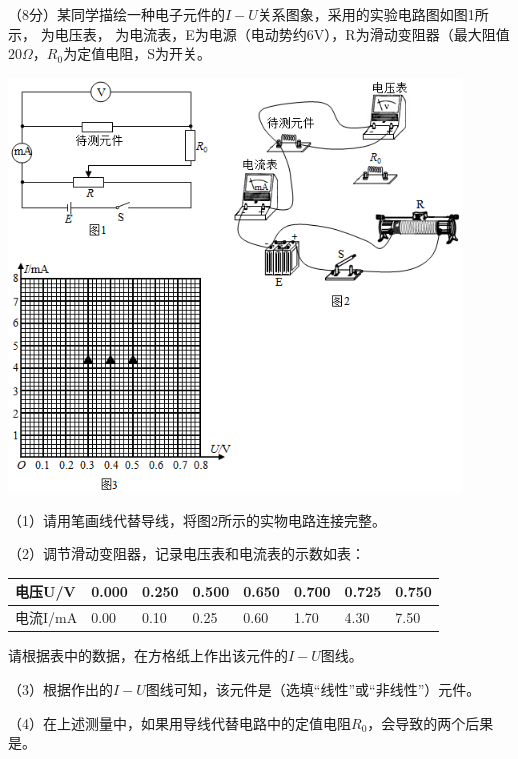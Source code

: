 \question[6] （8分）某同学描绘一种电子元件的$I-U$关系图象，采用的实验电路图如图1所示，  为电压表， 为电流表，E为电源（电动势约6V），R为滑动变阻器（最大阻值$20\Omega$，$R_0$为定值电阻，S为开关。\begin{center}\includegraphics[width=12cm]{img/image11.png}\end{center}

（1）请用笔画线代替导线，将图2所示的实物电路连接完整。

（2）调节滑动变阻器，记录电压表和电流表的示数如表：
\begin{table}[h]
    \begin{center}
        \begin{tabular}{|l|l|l|l|l|l|l|l|}
            \hline
            电压U/V  & 0.000 & 0.250 & 0.500 & 0.650 & 0.700 & 0.725 & 0.750 \\ \hline
            电流I/mA & 0.00  & 0.10  & 0.25  & 0.60  & 1.70  & 4.30  & 7.50  \\ \hline
            \end{tabular}
    \end{center}
\end{table}

请根据表中的数据，在方格纸上作出该元件的$I-U$图线。

（3）根据作出的$I-U$图线可知，该元件是（选填“线性”或“非线性”）元件。

（4）在上述测量中，如果用导线代替电路中的定值电阻$R_0$，会导致的两个后果是。

